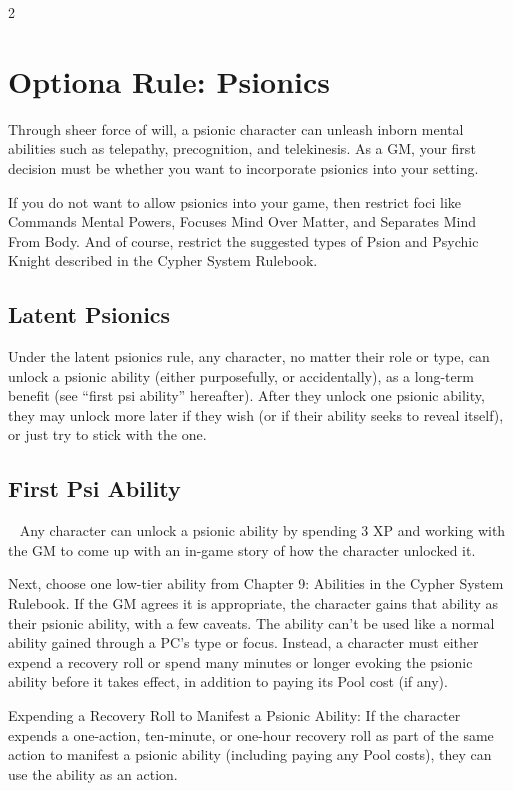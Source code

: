 \begin{multicols}{2}

\chapter{Optiona Rule: Psionics}

Through sheer force of will, a psionic character can unleash inborn mental abilities such as telepathy, precognition, and telekinesis. As a GM, your first decision must be whether you want to incorporate psionics into your setting.

If you do not want to allow psionics into your game, then restrict foci like Commands Mental Powers, Focuses Mind Over Matter, and Separates Mind From Body. And of course, restrict the suggested types of Psion and Psychic Knight described in the Cypher System Rulebook.

\section{Latent Psionics}

Under the latent psionics rule, any character, no matter their role or type, can unlock a psionic ability (either purposefully, or accidentally), as a long-term benefit (see “first psi ability” hereafter). After they unlock one psionic ability, they may unlock more later if they wish (or if their ability seeks to reveal itself), or just try to stick with the one.

\section{First Psi Ability}
 
Any character can unlock a psionic ability by spending 3 XP and working with the GM to come up with an in-game story of how the character unlocked it. 

Next, choose one low-tier ability from Chapter 9: Abilities in the Cypher System Rulebook. If the GM agrees it is appropriate, the character gains that ability as their psionic ability, with a few caveats. The ability can’t be used like a normal ability gained through a PC’s type or focus. Instead, a character must either expend a recovery roll or spend many minutes or longer evoking the psionic ability before it takes effect, in addition to paying its Pool cost (if any).

Expending a Recovery Roll to Manifest a Psionic Ability: If the character expends a one-action, ten-minute, or one-hour recovery roll as part of the same action to manifest a psionic ability (including paying any Pool costs), they can use the ability as an action.


\end{multicols}
